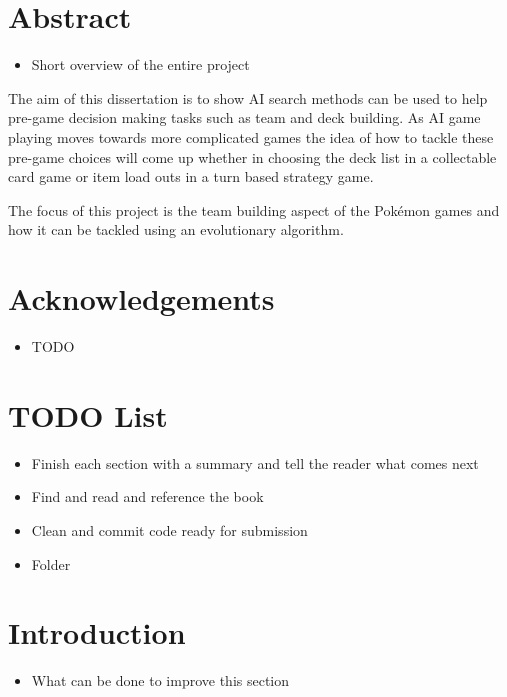 \documentclass[a4paper]{article}
\newcommand{\Pokemon}{Pok\'{e}mon}
\begin{document}
\setcounter{page}{1}

\section*{Abstract}
\begin{itemize}
    \item Short overview of the entire project
\end{itemize}
The aim of this dissertation is to show AI search methods can be used to help pre-game decision making tasks such as team and deck building.
As AI game playing moves towards more complicated games the idea of how to tackle these pre-game choices will come up whether in choosing the deck list in a collectable card game or item load outs in a turn based strategy game.
\par
The focus of this project is the team building aspect of the \Pokemon{} games and how it can be tackled using an evolutionary algorithm.
\vfill
\section*{Acknowledgements}
\begin{itemize}
    \item TODO
\end{itemize}

\vfill
\section*{TODO List}
\begin{itemize}
    \item Finish each section with a summary and tell the reader what comes next
	\item Find and read and reference the book
	\item Clean and commit code ready for submission
	\item Folder
\end{itemize}

\pagebreak

\tableofcontents
\pagebreak
\setcounter{page}{1}

\section{Introduction}
\begin{itemize}
	\item What can be done to improve this section
\end{itemize}
\end{document}
